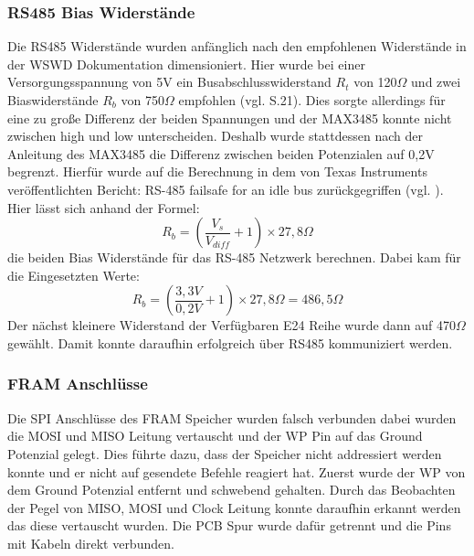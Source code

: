 \subsubsection{RS485 Bias Widerstände}
Die RS485 Widerstände wurden anfänglich nach den empfohlenen Widerstände in der WSWD Dokumentation dimensioniert. Hier wurde bei einer Versorgungsspannung von 5V ein Busabschlusswiderstand $R_t$ von 120$\Omega$ und zwei Biaswiderstände $R_b$ von 750$\Omega$ empfohlen (vgl.\cite{WSWD} S.21). Dies sorgte allerdings für eine zu große Differenz der beiden Spannungen und der MAX3485 konnte nicht zwischen high und low unterscheiden. Deshalb wurde stattdessen nach der Anleitung des MAX3485 die Differenz zwischen beiden Potenzialen auf 0,2V begrenzt. Hierfür wurde auf die Berechnung in dem von Texas Instruments veröffentlichten Bericht: \glqq{}RS-485 failsafe for an idle bus\grqq{} zurückgegriffen (vgl. \cite{Texas_instruments}). Hier lässt sich anhand der Formel: 
\begin{equation}
	R_b = (\frac{V_s}{V_{diff }}+1)\times27,8\Omega
\end{equation}
die beiden Bias Widerstände für das RS-485 Netzwerk berechnen. Dabei kam für die Eingesetzten Werte:
\begin{equation}
	R_b = (\frac{3,3V}{0,2V}+1)\times27,8\Omega = 486,5\Omega
\end{equation}
Der nächst kleinere Widerstand der Verfügbaren E24 Reihe wurde dann auf 470$\Omega$ gewählt. Damit konnte daraufhin erfolgreich über RS485 kommuniziert werden.
\subsubsection{FRAM Anschlüsse}
Die SPI Anschlüsse des FRAM Speicher wurden falsch verbunden dabei wurden die \ac{MOSI} und \ac{MISO} Leitung vertauscht und der \ac{WP} Pin auf das Ground Potenzial gelegt. Dies führte dazu, dass der Speicher nicht addressiert werden konnte und er nicht auf gesendete Befehle reagiert hat. Zuerst wurde der \ac{WP} von dem Ground Potenzial entfernt und schwebend gehalten. Durch das Beobachten der Pegel von MISO, MOSI und Clock Leitung konnte daraufhin erkannt werden das diese vertauscht wurden. Die PCB Spur wurde dafür getrennt und die Pins mit Kabeln direkt verbunden.
